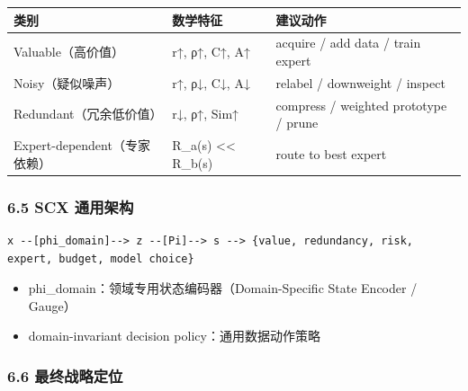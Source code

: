 \documentclass[
  12pt,
]{ctexart}
\providecommand{\tightlist}{%
  \setlength{\itemsep}{0pt}\setlength{\parskip}{0pt}}
\begin{document}
\begin{longtable}[]{@{}
  >{\raggedright\arraybackslash}p{}
  >{\raggedright\arraybackslash}p{}
  >{\raggedright\arraybackslash}p{}@{}}
\toprule\noalign{}
\begin{minipage}[b]{\linewidth}\raggedright
类别
\end{minipage} & \begin{minipage}[b]{\linewidth}\raggedright
数学特征
\end{minipage} & \begin{minipage}[b]{\linewidth}\raggedright
建议动作
\end{minipage} \\
\midrule\noalign{}
\endhead
\bottomrule\noalign{}
\endlastfoot
Valuable（高价值） & r↑, ρ↑, C↑, A↑ & acquire / add data / train
expert \\
Noisy（疑似噪声） & r↑, ρ↓, C↓, A↓ & relabel / downweight / inspect \\
Redundant（冗余低价值） & r↓, ρ↑, Sim↑ & compress / weighted prototype /
prune \\
Expert-dependent（专家依赖） & R\_a(s) \textless\textless{} R\_b(s) &
route to best expert \\
\end{longtable}

\subsubsection{6.5 SCX 通用架构}\label{scx-ux901aux7528ux67b6ux6784}

\begin{verbatim}
x --[phi_domain]--> z --[Pi]--> s --> {value, redundancy, risk, expert, budget, model choice}
\end{verbatim}

\begin{itemize}
\tightlist
\item
  phi\_domain：领域专用状态编码器（Domain-Specific State Encoder /
  Gauge）
\item
  domain-invariant decision policy：通用数据动作策略
\end{itemize}

\subsubsection{6.6
最终战略定位}\label{ux6700ux7ec8ux6218ux7565ux5b9aux4f4d}
\end{document}
